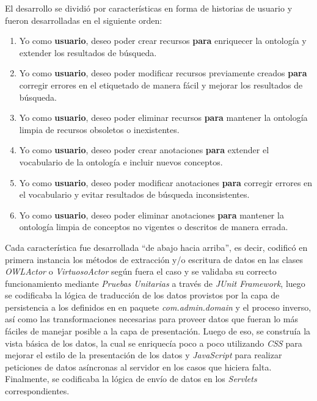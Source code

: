 \begin{itemize}
\begin{itemize}
\end{itemize}

El desarrollo se dividió por características en forma de historias de usuario y fueron desarrolladas en el siguiente orden:

\begin{enumerate}
    \item Yo como \textbf{usuario}, deseo poder crear recursos \textbf{para} enriquecer la ontología y extender los resultados de búsqueda.
    \item Yo como \textbf{usuario}, deseo poder modificar recursos previamente creados \textbf{para} corregir errores en el etiquetado de manera fácil y mejorar los resultados de búsqueda.
    \item Yo como \textbf{usuario}, deseo poder eliminar recursos \textbf{para} mantener la ontología limpia de recursos obsoletos o inexistentes.
    \item Yo como \textbf{usuario}, deseo poder crear anotaciones \textbf{para} extender el vocabulario de la ontología e incluir nuevos conceptos.
    \item Yo como \textbf{usuario}, deseo poder modificar anotaciones \textbf{para} corregir errores en el vocabulario y evitar resultados de búsqueda inconsistentes.
    \item Yo como \textbf{usuario}, deseo poder eliminar anotaciones \textbf{para} mantener la ontología limpia de conceptos no vigentes o descritos de manera errada.
\end{enumerate}

Cada característica fue desarrollada ``de abajo hacia arriba'', es decir, codificó en primera instancia los métodos de extracción y/o escritura de datos en las clases \textit{OWLActor} o \textit{VirtuosoActor} según fuera el caso y se validaba su correcto funcionamiento mediante \textit{Pruebas Unitarias} a través de \textit{JUnit Framework}, luego se codificaba la lógica de traducción de los datos provistos por la capa de persistencia a los definidos en en paquete \textit{com.admin.domain} y el proceso inverso, así como las transformaciones necesarias para proveer datos que fueran lo más fáciles de manejar posible a la capa de presentación. Luego de eso, se construía la vista básica de los datos, la cual se enriquecía poco a poco utilizando \textit{CSS} para mejorar el estilo de la presentación de los datos y \textit{JavaScript} para realizar peticiones de datos asíncronas al servidor en los casos que hiciera falta. Finalmente, se codificaba la lógica de envío de datos en los \textit{Servlets} correspondientes.


\end{itemize}
